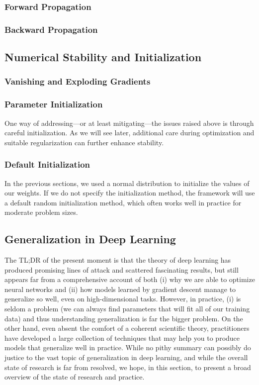 \documentclass[a4paper,12pt]{article}
\theoremstyle{definition}
\begin{document}
    \subsubsection*{Forward Propagation}

    \subsubsection*{Backward Propagation}



    \subsection*{Numerical Stability and Initialization}
    \subsubsection*{Vanishing and Exploding Gradients}
    
    \subsubsection*{Parameter Initialization}
    One way of addressing—or at least mitigating—the issues raised above is through careful initialization. As we will see later, additional care during optimization and 
    suitable regularization can further enhance stability.

    \subsubsection*{Default Initialization}
    In the previous sections, we used a normal distribution to initialize the values of our weights. If we do not specify the initialization method, the framework will 
    use a default random initialization method, which often works well in practice for moderate problem sizes.

    \subsection*{Generalization in Deep Learning}
    The TL;DR of the present moment is that the theory of deep learning has produced promising lines of attack and scattered fascinating results, but still appears far 
    from a comprehensive account of both (i) why we are able to optimize neural networks and (ii) how models learned by gradient descent manage to generalize so well, 
    even on high-dimensional tasks. However, in practice, (i) is seldom a problem (we can always find parameters that will fit all of our training data) and thus understanding 
    generalization is far the bigger problem. On the other hand, even absent the comfort of a coherent scientific theory, practitioners have developed a large collection 
    of techniques that may help you to produce models that generalize well in practice. While no pithy summary can possibly do justice to the vast topic of generalization 
    in deep learning, and while the overall state of research is far from resolved, we hope, in this section, to present a broad overview of the state of research and practice.
    
\end{document}
